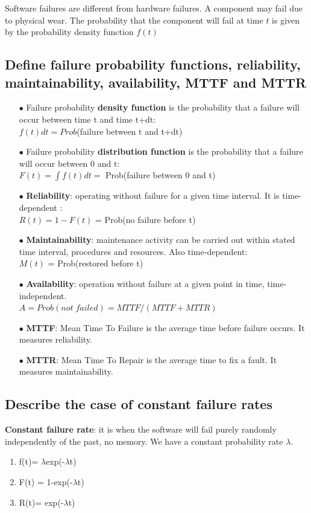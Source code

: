 \documentclass{article}
\begin{document}
Software failures are different from hardware failures. A component may fail due to
physical wear. The probability that the component will fail at time $t$ is given by the
probability density function $f(t)$

\subsection{Define failure probability functions, reliability, maintainability, availability, MTTF and MTTR}
\begin{itemize}
    \item [$\bullet$]Failure probability \textbf{density function} is the probability that a failure will occur between time t and time t+dt:\\ $f(t)dt=Prob$(failure between t and t+dt)
    \item [$\bullet$]Failure probability \textbf{distribution function} is the probability that a failure will occur between 0 and t: \\
    $F(t)=\int f(t)dt =$ Prob(failure between 0 and t)
    \item [$\bullet$]\textbf{Reliability}: operating without failure for a given time interval. It is time-dependent : \\$R(t) = 1-F(t)$ = Prob(no failure before t)
    \item [$\bullet$]\textbf{Maintainability}: maintenance activity can be carried out within stated time interval, procedures and resources. Also time-dependent:\\ $M(t)$ = Prob(restored before t)
    \item [$\bullet$]\textbf{Availability}: operation without failure at a given point in time, time-independent. \\$A=Prob(not \;failed)= MTTF/(MTTF+MTTR)$
    \item [$\bullet$]\textbf{MTTF}: Mean Time To Failure is the average time before failure occurs. It measures reliability.
    \item [$\bullet$]\textbf{MTTR}: Mean Time To Repair is the average time to fix a fault. It measures maintainability.
\end{itemize}


\subsection{Describe the case of constant failure rates}

\textbf{Constant failure rate}: it is when the software will fail purely randomly independently of the past, no memory.
We have a constant probability rate $\lambda$.
\begin{enumerate}
    \item f(t)= $\lambda$exp(-$\lambda$t)
    \item F(t) = 1-exp(-$\lambda$t)
    \item R(t)= exp(-$\lambda$t)
\end{enumerate}  
\end{document}
